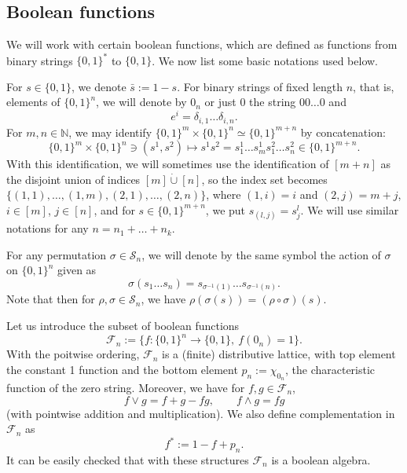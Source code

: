 \documentclass[12pt]{article}
\theoremstyle{definition}
\theoremstyle{remark}
\def\Fe{\mathcal F}
\def\permut{\mathscr{S}}
\begin{document}
\subsection{Boolean functions}


We will work with certain boolean functions, which are defined as  functions from binary
strings $\{0,1\}^*$ to $\{0,1\}$. We now list some basic notations used below.

For $s\in \{0,1\}$, we denote $\bar s:=1-s$.
For binary strings of fixed length $n$, that is, elements of
$\{0,1\}^n$, we will denote by $0_n$ or just $0$ the string $00\dots0$ and 
\[
e^i=\delta_{i,1}\dots\delta_{i,n}.
\]
For $m,n\in \mathbb N$, we may identify $ \{0,1\}^m\times \{0,1\}^n\simeq \{0,1\}^{m+n}$
by concatenation: 
\[
\{0,1\}^m\times \{0,1\}^n\ni(s^1,s^2)\mapsto s^1s^2=s^1_1\dots s^1_ms^2_1\dots s^2_n\in \{0,1\}^{m+n}.
\]
With this identification, we will sometimes use the identification of $[m+n]$ as the
disjoint union of indices  $[m]\dot{\cup} [n]$, so the index set becomes
$\{(1,1),\dots, (1,m),(2,1),\dots,(2,n)\}$, where $(1,i)=i$ and $(2,j)=m+j$, $i\in [m]$,
$j\in [n]$, and for $s\in \{0,1\}^{m+n}$, we put $s_{(l,j)}=s^l_j$. We will use similar
notations for any $n=n_1+\dots+n_k$. 






For any permutation $\sigma\in \permut_n$, we will denote by the same symbol the action
of $\sigma$ on $\{0,1\}^n$ given as 
\[
\sigma(s_1\dots s_n)=s_{\sigma^{-1}(1)}\dots s_{\sigma^{-1}(n)}.
\]
Note that then for $\rho,\sigma\in \permut_n$, we have
$\rho(\sigma(s))=(\rho\circ\sigma)(s)$. 

Let us introduce the subset of boolean functions 
\[
\Fe_n:=\{f:\{0,1\}^n\to \{0,1\},\ f(0_n)=1\}.
\]
With the poitwise ordering, $\Fe_n$ is  a (finite) distributive lattice, with top element
 the constant 1 function and the bottom element $p_n:=\chi_{0_n}$, the characteristic
 function of the zero string. Moreover, we have for $f,g\in \Fe_n$,
\begin{equation}\label{eq:wedgevee_fun}
f\vee g= f+g-fg,\qquad f\wedge g=fg
\end{equation}
(with pointwise addition and multiplication). We also define complementation  in $\Fe_n$ as
\[
f^*:=1-f+p_n.
\]
It can be easily checked that with these structures $\Fe_n$ is a boolean algebra.
\end{document}
